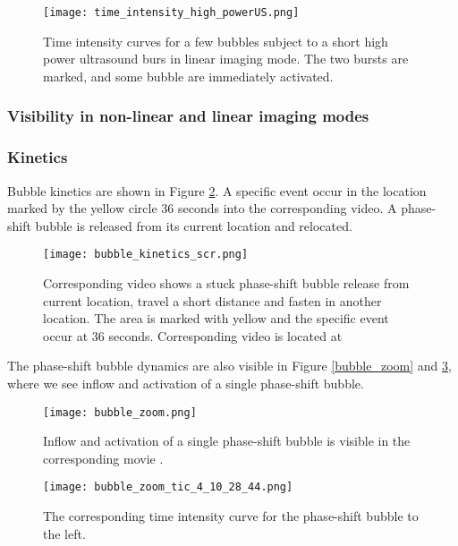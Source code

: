 \begin{figure}[h]
  \centering
  \texttt{[image: time\_intensity\_high\_powerUS.png]}
  \caption{Time intensity curves for a few bubbles subject to a short high power ultrasound burs in linear imaging mode. The two bursts are marked, and some bubble are immediately activated.}
  \label{Fig:high_power_US}
\end{figure}
 

\subsubsection{Visibility in non-linear and linear imaging modes} 

\subsubsection{Kinetics}
Bubble kinetics are shown in Figure \ref{Fig:bubble_kinetic}. A specific event occur in the location marked by the yellow circle 36 seconds into the corresponding video. A phase-shift bubble is released from its current location and relocated. 

\begin{figure}[h]
  \centering
  \texttt{[image: bubble\_kinetics\_scr.png]}
  \cprotect\caption{Corresponding video shows a stuck phase-shift bubble release from current location, travel a short distance and fasten in another location. The area is marked with yellow and the specific event occur at 36 seconds. Corresponding video is located at }
  \label{Fig:bubble_kinetic}
\end{figure}

The phase-shift bubble dynamics are also visible in Figure \ref{bubble_zoom} and \ref{bubble_zoom_tic}, where we see inflow and activation of a single phase-shift bubble.

\begin{figure}
	\centering
	\begin{minipage}[t]{.45\textwidth}
		\centering
		\texttt{[image: bubble\_zoom.png]}
		\cprotect\caption{Inflow and activation of a single phase-shift bubble is visible in the corresponding movie .}
		\label{bubble_zoom}
	\end{minipage}\hfill
	\begin{minipage}[t]{.45\textwidth}
		\centering
		\texttt{[image: bubble\_zoom\_tic\_4\_10\_28\_44.png]}
		\caption{The corresponding time intensity curve for the phase-shift bubble to the left.}
		\label{bubble_zoom_tic}
	\end{minipage}
\end{figure}


